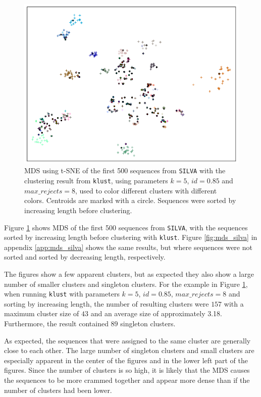 \begin{figure}[H]
  \centering
    \includegraphics[width=1.0\textwidth]{graphics/SILVA_t-SNE_incr_sort_500.png}
    \caption{MDS using t-SNE of the first 500 sequences from \texttt{SILVA} with
    the clustering result from \texttt{klust}, using parameters $k=5$,
    $id=0.85$ and $max\_rejects=8$, used to color different clusters with
    different colors. Centroids are marked with a circle. Sequences were sorted
    by increasing length before clustering.}
    \label{fig:mds_silva_sort_incr}
\end{figure}

Figure \ref{fig:mds_silva_sort_incr} shows MDS of the first 500 sequences from
\texttt{SILVA}, with the sequences sorted by increasing length before
clustering with \texttt{klust}. Figure \ref{fig:mds_silva} in appendix
\ref{app:mds_silva} shows the same results, but where sequences were not sorted
and sorted by decreasing length, respectively.

The figures show a few apparent clusters, but as expected they also show a
large number of smaller clusters and singleton clusters. For the example in
Figure \ref{fig:mds_silva_sort_incr}, when running \texttt{klust} with
parameters $k=5$, $id=0.85$, $max\_rejects=8$ and sorting by increasing
length, the number of resulting clusters were $157$ with a maximum cluster
size of $43$ and an average size of approximately \num{3.18}. Furthermore, the
result contained $89$ singleton clusters. 

As expected, the sequences that were assigned to the same cluster are
generally close to each other. The large number of singleton clusters and
small clusters are especially apparent in the center of the figures and in the
lower left part of the figures. Since the number of clusters is so high, it is
likely that the MDS causes the sequences to be more crammed together and
appear more dense than if the number of clusters had been lower.


